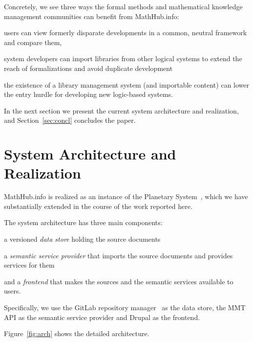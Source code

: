 \documentclass{llncs}
\def\mmt{\textsf{MMT}\xspace}
\def\sys{\textsf{MathHub.info}\xspace}
\begin{document}
Concretely, we see three ways the formal methods and mathematical knowledge management
communities can benefit from \sys:
\begin{inparaenum}[\em i\rm)]
\item users can view formerly disparate developments in a common, neutral framework and
  compare them,
\item system developers can import libraries from other logical systems to extend the
  reach of formalizations and avoid duplicate development
\item the existence of a library management system (and importable content) can lower the
  entry hurdle for developing new logic-based systems.
\end{inparaenum}
In the next section we present the current system architecture and realization, and
Section~\ref{sec:concl} concludes the paper.

\section{System Architecture and Realization}\label{sec:arch}

\sys is realized as an instance of the Planetary System~\cite{Kohlhase:ppte12}, which we have substantially extended in the course of the work reported here. 

The system architecture has three main components: 
\begin{inparaenum}[\em i\rm)]
 \item a versioned \emph{data store} holding the source documents
 \item a \emph{semantic service provider} that imports the source documents and provides services for them 
 \item and a \emph{frontend} that makes the sources and the semantic services available to users.
\end{inparaenum}
Specifically, we use the GitLab repository manager~\cite{GitLab:on} as the data store, the \mmt API as the semantic service provider and Drupal as the frontend. 

Figure~\ref{fig:arch} shows the detailed architecture.
\end{document}
